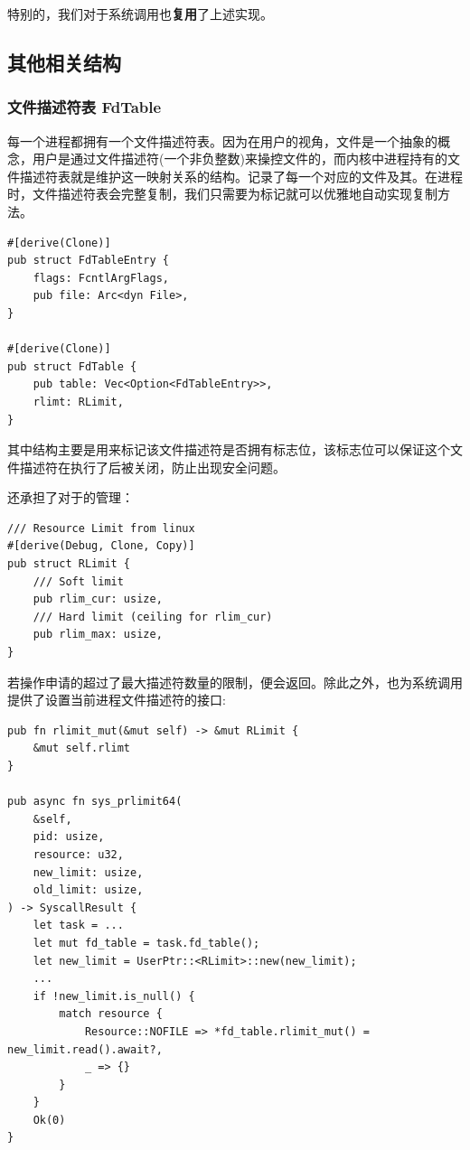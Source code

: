 \documentclass{article}
\begin{document}
特别的，我们对于系统调用也\textbf{复用}了上述实现。

\subsection{其他相关结构}
\subsubsection{文件描述符表 FdTable}
每一个进程都拥有一个文件描述符表。因为在用户的视角，文件是一个抽象的概念，用户是通过文件描述符(一个非负整数)来操控文件的，而内核中进程持有的文件描述符表就是维护这一映射关系的结构。记录了每一个对应的文件及其。在进程时，文件描述符表会完整复制，我们只需要为标记就可以优雅地自动实现复制方法。

\begin{lstlisting}
#[derive(Clone)]
pub struct FdTableEntry {
    flags: FcntlArgFlags,
    pub file: Arc<dyn File>,
}

#[derive(Clone)]
pub struct FdTable {
    pub table: Vec<Option<FdTableEntry>>,
    rlimt: RLimit,
}
\end{lstlisting}

其中结构主要是用来标记该文件描述符是否拥有标志位，该标志位可以保证这个文件描述符在执行了后被关闭，防止出现安全问题。

还承担了对于的管理：
\begin{lstlisting}
/// Resource Limit from linux
#[derive(Debug, Clone, Copy)]
pub struct RLimit {
    /// Soft limit
    pub rlim_cur: usize,
    /// Hard limit (ceiling for rlim_cur)
    pub rlim_max: usize,
}
\end{lstlisting}

若操作申请的超过了最大描述符数量的限制，便会返回。除此之外，也为系统调用提供了设置当前进程文件描述符的接口: 

\begin{lstlisting}
pub fn rlimit_mut(&mut self) -> &mut RLimit {
    &mut self.rlimt
}

pub async fn sys_prlimit64(
    &self,
    pid: usize,
    resource: u32,
    new_limit: usize,
    old_limit: usize,
) -> SyscallResult {
    let task = ...
    let mut fd_table = task.fd_table();
    let new_limit = UserPtr::<RLimit>::new(new_limit);
    ...
    if !new_limit.is_null() {
        match resource {
            Resource::NOFILE => *fd_table.rlimit_mut() = new_limit.read().await?,
            _ => {}
        }
    }
    Ok(0)
}
\end{lstlisting}
\end{document}
